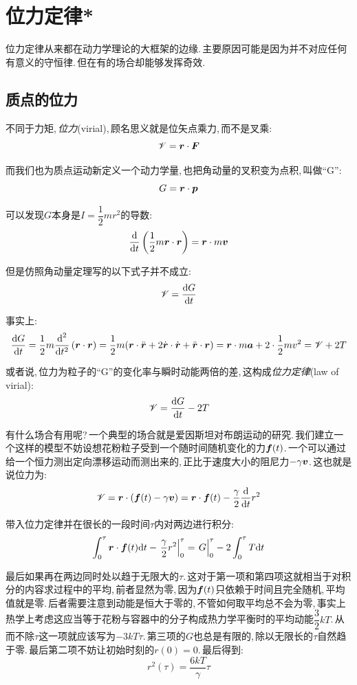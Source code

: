 \section{位力定律*}
位力定律从来都在动力学理论的大框架的边缘.\,主要原因可能是因为并不对应任何有意义的守恒律.\,但在有的场合却能够发挥奇效.

\subsection{质点的位力}
不同于力矩,\,\emph{位力}(virial),\,顾名思义就是位矢点乘力,\,而不是叉乘:
\[\mathscr{V}=\boldsymbol{r}\cdot \boldsymbol{F}\]

而我们也为质点运动新定义一个动力学量,\,也把角动量的叉积变为点积,\,叫做``G'':
\[G=\boldsymbol{r}\cdot\boldsymbol{p}\]

可以发现$G$本身是$I=\dfrac{1}{2}mr^2$的导数:
\[\frac{\textrm{d}}{\textrm{d} t}\left(\frac{1}{2}m\boldsymbol{r}\cdot\boldsymbol{r}\right)=\boldsymbol{r}\cdot m\boldsymbol{v}\]

但是仿照角动量定理写的以下式子并不成立:
\[\mathscr{V}=\frac{\textrm{d} G}{\textrm{d} t}\]

事实上:
\[\frac{\textrm{d} G}{\textrm{d} t}=\frac{1}{2}m\frac{\textrm{d}^2}{\textrm{d} t^2}\left(\boldsymbol{r}\cdot\boldsymbol{r}\right)=\frac{1}{2}m(\boldsymbol{r}\cdot \ddot{\boldsymbol{r}}+2\dot{\boldsymbol{r}}\cdot \dot{\boldsymbol{r}}+\ddot{\boldsymbol{r}}\cdot \boldsymbol{r})=\boldsymbol{r}\cdot m\boldsymbol{a}+2\cdot \frac{1}{2}mv^2=\mathscr{V}+2T\]

或者说,\,位力为粒子的``G''的变化率与瞬时动能两倍的差,\,这构成\emph{位力定律}(law of virial):
\[\mathscr{V}=\frac{\textrm{d} G}{\textrm{d} t}-2T\]

有什么场合有用呢?\,一个典型的场合就是爱因斯坦对布朗运动的研究.\,我们建立一个这样的模型不妨设想花粉粒子受到一个随时间随机变化的力$\boldsymbol{f}(t)$.\,一个可以通过给一个恒力测出定向漂移运动而测出来的,\,正比于速度大小的阻尼力$-\gamma \boldsymbol{v}$.\,这也就是说位力为:
\[\mathscr{V}=\boldsymbol{r}\cdot (\boldsymbol{f}(t)-\gamma \boldsymbol{v})=\boldsymbol{r}\cdot \boldsymbol{f}(t)-\frac{\gamma}{2}\frac{\textrm{d}}{\textrm{d} t}r^2\]

带入位力定律并在很长的一段时间$\tau$内对两边进行积分:
\[\int_0^\tau \bs{r}\cdot \bs{f}(t)\ud t-\left.\frac{\gamma}{2}r^2\right|_{0}^{\tau}=\left.\phantom{\frac{\gamma}{2}}\!\!\!\!\!G\right|_{0}^{\tau} -2\int_0^\tau T\ud t\]

最后如果再在两边同时处以趋于无限大的$\tau$.\,这对于第一项和第四项这就相当于对积分的内容求过程中的平均,\,前者显然为零,\,因为$\boldsymbol{f}(t)$只依赖于时间且完全随机,\,平均值就是零.\,后者需要注意到动能是恒大于零的,\,不管如何取平均总不会为零,\,事实上热学上考虑这应当等于花粉与容器中的分子构成热力学平衡时的平均动能$\dfrac{3}{2}kT$.\,从而不除$\tau$这一项就应该写为$-3kT\tau$.\,第三项的$G$也总是有限的,\,除以无限长的$\tau$自然趋于零.\,最后第二项不妨让初始时刻的$r(0)=0$.\,最后得到:
\[r^2(\tau)=\frac{6kT}{\gamma}\tau\]

